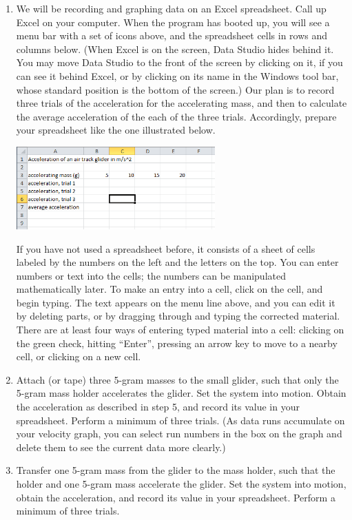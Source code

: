 \begin{enumerate}[label=\arabic*.]
\item We will be recording and graphing data on an Excel spreadsheet.  Call up Excel on your computer.  When the program has booted up, you will see a menu bar with a set of icons above, and the spreadsheet cells in rows and columns below.  (When Excel is on the screen, Data Studio hides behind it.  You may move Data Studio to the front of the screen by clicking on it, if you can see it behind Excel, or by clicking on its name in the Windows tool bar, whose standard position is the bottom of the screen.)  Our plan is to record three trials of the acceleration for the accelerating mass, and then to calculate the average acceleration of the each of the three trials.  Accordingly, prepare your spreadsheet like the one illustrated below.
\begin{center} \includegraphics*[width=0.6\textwidth]{imgs/6labs/6Alab/6Aexp3/6A_exp3_Excel_Spreadsheet1.png} \end{center}

If you have not used a spreadsheet before, it consists of a sheet of cells labeled by the numbers on the left and the letters on the top.  You can enter numbers or text into the cells; the numbers can be manipulated mathematically later.  To make an entry into a cell, click on the cell, and begin typing.  The text appears on the menu line above, and you can edit it by deleting parts, or by dragging through and typing the corrected material.  There are at least four ways of entering typed material into a cell: clicking on the green check, hitting ``Enter'', pressing an arrow key to move to a nearby cell, or clicking on a new cell.

\item Attach (or tape) three 5-gram masses to the small glider, such that only the 5-gram mass holder accelerates the glider.  Set the system into motion.  Obtain the acceleration as described in step 5, and record its value in your spreadsheet.  Perform a minimum of three trials.  (As data runs accumulate on your velocity graph, you can select run numbers in the box on the graph and delete them to see the current data more clearly.)

\item Transfer one 5-gram mass from the glider to the mass holder, such that the holder and one 5-gram mass accelerate the glider.  Set the system into motion, obtain the acceleration, and record its value in your spreadsheet.  Perform a minimum of three trials.


\end{enumerate}
